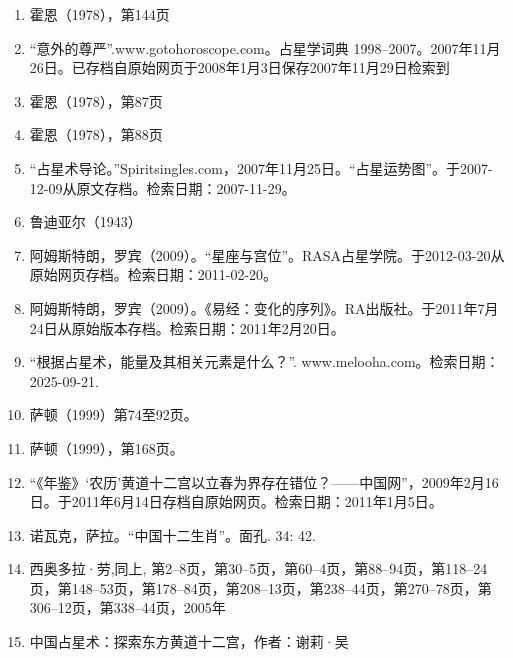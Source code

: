 \begin{enumerate}
\item 霍恩（1978），第144页
\item “意外的尊严”.www.gotohoroscope.com。占星学词典 1998–2007。2007年11月26日。已存档自原始网页于2008年1月3日保存2007年11月29日检索到
\item 霍恩（1978），第87页
\item 霍恩（1978），第88页
\item “占星术导论。”Spiritsingles.com，2007年11月25日。“占星运势图”。于2007-12-09从原文存档。检索日期：2007-11-29。
\item 鲁迪亚尔（1943）
\item 阿姆斯特朗，罗宾（2009）。“星座与宫位”。RASA占星学院。于2012-03-20从原始网页存档。检索日期：2011-02-20。
\item 阿姆斯特朗，罗宾（2009）。《易经：变化的序列》。RA出版社。于2011年7月24日从原始版本存档。检索日期：2011年2月20日。
\item “根据占星术，能量及其相关元素是什么？”. www.melooha.com。检索日期：2025-09-21.
\item 萨顿（1999）第74至92页。
\item 萨顿（1999），第168页。
\item “《年鉴》‘农历’黄道十二宫以立春为界存在错位？——中国网”，2009年2月16日。于2011年6月14日存档自原始网页。检索日期：2011年1月5日。
\item 诺瓦克，萨拉。“中国十二生肖”。面孔. 34: 42.
\item 西奥多拉·劳,同上, 第2–8页，第30–5页，第60–4页，第88–94页，第118–24页，第148–53页，第178–84页，第208–13页，第238–44页，第270–78页，第306–12页，第338–44页，2005年
\item 中国占星术：探索东方黄道十二宫，作者：谢莉·吴
\end{enumerate}
